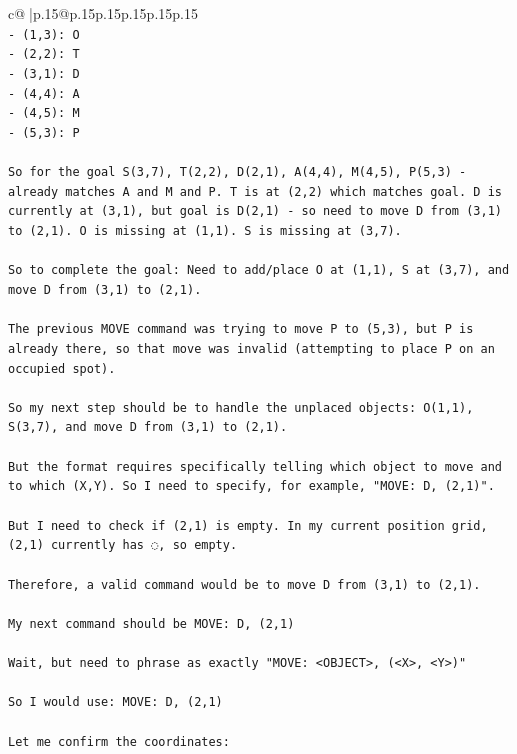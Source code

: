 \documentclass{article}
\begin{document}
{\begin{supertabular}{c@{$\;$}|p{.15\linewidth}@{}p{.15\linewidth}p{.15\linewidth}p{.15\linewidth}p{.15\linewidth}p{.15\linewidth}}
{{{\\ 
\texttt{{-} (1,3): O} \\
\texttt{{-} (2,2): T} \\
\texttt{{-} (3,1): D} \\
\texttt{{-} (4,4): A} \\
\texttt{{-} (4,5): M} \\
\texttt{{-} (5,3): P} \\
\\ 
\texttt{So for the goal S(3,7), T(2,2), D(2,1), A(4,4), M(4,5), P(5,3) {-} already matches A and M and P. T is at (2,2) which matches goal. D is currently at (3,1), but goal is D(2,1) {-} so need to move D from (3,1) to (2,1). O is missing at (1,1). S is missing at (3,7).} \\
\\ 
\texttt{So to complete the goal: Need to add/place O at (1,1), S at (3,7), and move D from (3,1) to (2,1).} \\
\\ 
\texttt{The previous MOVE command was trying to move P to (5,3), but P is already there, so that move was invalid (attempting to place P on an occupied spot).} \\
\\ 
\texttt{So my next step should be to handle the unplaced objects: O(1,1), S(3,7), and move D from (3,1) to (2,1).} \\
\\ 
\texttt{But the format requires specifically telling which object to move and to which (X,Y). So I need to specify, for example, "MOVE: D, (2,1)".} \\
\\ 
\texttt{But I need to check if (2,1) is empty. In my current position grid, (2,1) currently has ◌, so empty.} \\
\\ 
\texttt{Therefore, a valid command would be to move D from (3,1) to (2,1).} \\
\\ 
\texttt{My next command should be MOVE: D, (2,1)} \\
\\ 
\texttt{Wait, but need to phrase as exactly "MOVE: <OBJECT>, (<X>, <Y>)"} \\
\\ 
\texttt{So I would use: MOVE: D, (2,1)} \\
\\ 
\texttt{Let me confirm the coordinates:} \\
\\ 
}}}
\end{supertabular}}
\end{document}
